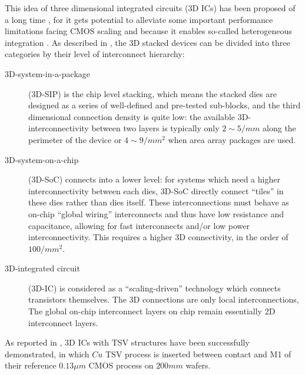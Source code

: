 This idea of three dimensional integrated circuits (3D ICs) has been proposed of a long time \cite{Beyne20043D},
for it gets potential to alleviate some important performance limitations facing CMOS scaling 
and because it enables so-called heterogeneous integration \cite{Beyne2006Rise}.
As described in \cite{Beyne20043D}, the 3D stacked devices can be divided into three categories
by their level of interconnect hierarchy:
\begin{description}
    \item[3D-system-in-a-package] (3D-SIP) is the chip level stacking, which means the stacked
    dies are designed as a series of well-defined and pre-tested sub-blocks, 
    and the third dimensional connection density is quite low: the available 3D-interconnectivity 
    between two layers is typically only $2\sim5/mm$ along the perimeter of the device or $4\sim9/mm^2$
    when area array packages are used.
    
    \item[3D-system-on-a-chip] (3D-SoC) connects into a lower level: for systems which need a higher
    interconnectivity between each dies, 3D-SoC directly connect ``tiles'' in these dies rather than dies
    itself. These interconnections must behave as on-chip ``global wiring'' interconnects and thus have low
    resistance and capacitance, allowing for fast interconnects and/or low power interconnectivity.
    This requires a higher 3D connectivity, in the order of $100/mm^2$.
    
    \item[3D-integrated circuit] (3D-IC) is considered as a ``scaling-driven'' technology 
    which connects transistors themselves. The 3D connections are only local interconnections,
    The global on-chip interconnect layers on chip remain essentially 2D interconnect layers.
\end{description}


As reported in \cite{Olmen20083D}, 3D ICs with TSV structures have been successfully demonstrated, 
in which $Cu$ TSV process is inserted between contact and M1 of their reference $0.13 \mu m$ CMOS process on
$200mm$ wafers. 

